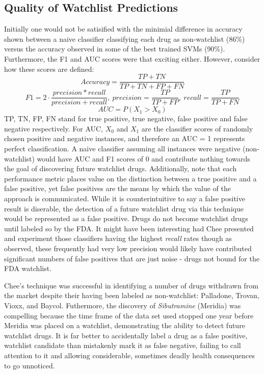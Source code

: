 \documentclass[twoside,11pt]{article}
\begin{document}
\subsection{Quality of Watchlist Predictions}
Initially one would not be satisified with the minimial difference in accuracy shown between a naive classifier classifying each drug as non-watchlist (86\%) versus the accuracy observed in some of the best trained SVMs (90\%). Furthermore, the F1 and AUC scores were that exciting either. However, consider how these scores are defined:
\[
  Accuracy = \frac{TP + TN}{TP + TN + FP + FN}
\]
\[
  F1 = 2 \cdot \frac{precision * recall}{precision + recall}, \ precision = \frac{TP}{TP+FP},\ recall = \frac{TP}{TP+FN}
\]
\[
  AUC = P(X_{1} > X_{0})
\]
TP, TN, FP, FN stand for true positive, true negative, false positive and false negative respectively. For AUC, $X_{0}$ and $X_{1}$ are the classifier scores of randomly chosen positive and negative instances, and therefore an AUC = 1 represents perfect classification. A naive classifier assuming all instances were negative (non-watchlist) would have AUC and F1 scores of 0 and contribute nothing towards the goal of discovering future watchlist drugs. Additionally, note that each performance metric places value on the distinction between a true positive and a false positive, yet false positives are the means by which the value of the approach is communicated.  While it is counterintuitive to say a false positive result is diserable, the detection of a future watchlist drug via this technique would be represented as a false positive. Drugs do not become watchlist drugs until labeled so by the FDA. It might have been interesting had Chee presented and experiment those classifiers having the highest \textit{recall} rates though as observed, these frequently had very low precision would likely have contributed significant numbers of false positives that are just noise - drugs not bound for the FDA watchlist.

Chee's technique was successful in identifying a number of drugs withdrawn from the market despite their having been labeled as non-watchlist:  Palladone,  Trovan, Vioxx, and Baycol. Futhermore, the discovery of \textit{Sibutramine} (Meridia) was compelling because the time frame of the data set used stopped one year before Meridia was placed on a watchlist, demonstrating the ability to detect future watchlist drugs. It is far better to accidentally label a drug as a false positive, watchlist candidate than mistakenly mark it as false negative, failing to call attention to it and allowing considerable, sometimes deadly health consequences to go unnoticed.
\end{document}
